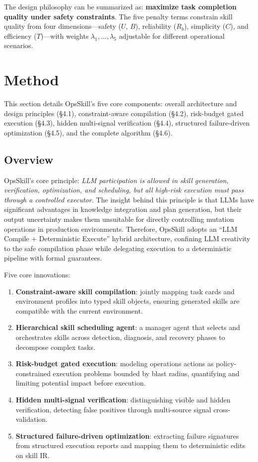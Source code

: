 \documentclass[conference,10pt]{IEEEtran}
\begin{document}
The design philosophy can be summarized as: \textbf{maximize task completion quality under safety constraints}.
The five penalty terms constrain skill quality from four dimensions---safety ($U$, $B$), reliability ($R_b$), simplicity ($C$), and efficiency ($T$)---with weights $\lambda_1, \ldots, \lambda_5$ adjustable for different operational scenarios.


\section{Method}

This section details OpsSkill's five core components: overall architecture and design principles (\S4.1), constraint-aware compilation (\S4.2), risk-budget gated execution (\S4.3), hidden multi-signal verification (\S4.4), structured failure-driven optimization (\S4.5), and the complete algorithm (\S4.6).

\subsection{Overview}

OpsSkill's core principle: \emph{LLM participation is allowed in skill generation, verification, optimization, and scheduling, but all high-risk execution must pass through a controlled executor.}
The insight behind this principle is that LLMs have significant advantages in knowledge integration and plan generation, but their output uncertainty makes them unsuitable for directly controlling mutation operations in production environments.
Therefore, OpsSkill adopts an ``LLM Compile + Deterministic Execute'' hybrid architecture, confining LLM creativity to the safe compilation phase while delegating execution to a deterministic pipeline with formal guarantees.

Five core innovations:
\begin{enumerate}
  \item \textbf{Constraint-aware skill compilation}: jointly mapping task cards and environment profiles into typed skill objects, ensuring generated skills are compatible with the current environment.
  \item \textbf{Hierarchical skill scheduling agent}: a manager agent that selects and orchestrates skills across detection, diagnosis, and recovery phases to decompose complex tasks.
  \item \textbf{Risk-budget gated execution}: modeling operations actions as policy-constrained execution problems bounded by blast radius, quantifying and limiting potential impact before execution.
  \item \textbf{Hidden multi-signal verification}: distinguishing visible and hidden verification, detecting false positives through multi-source signal cross-validation.
  \item \textbf{Structured failure-driven optimization}: extracting failure signatures from structured execution reports and mapping them to deterministic edits on skill IR.
\end{enumerate}
\end{document}

